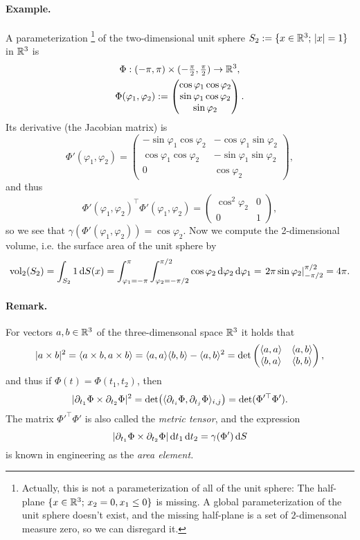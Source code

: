 \paragraph{Example.} A parameterization%
\footnote{Actually, this is not a parameterization of all of the unit sphere:
The half-plane $\{x\in\mathbb{R}^{3};\, x_{2}=0,x_{1}\le0\}$ is missing.
A global parameterization of the unit sphere doesn't exist, and the
missing half-plane is a set of $2$-dimensonal measure zero, so we
can disregard it.%
} of the two-dimensional unit sphere $S_{2}:=\{x\in\mathbb{R}^{3};\,\lvert x\rvert=1\}$
in $\mathbb{R}^{3}$ is\begin{gather*}
\Phi:(-\pi,\pi)\times(-\tfrac{\pi}{2},\tfrac{\pi}{2})\to\mathbb{R}^{3},\\
\Phi(\varphi_{1},\varphi_{2}):=\begin{pmatrix}\cos\varphi_{1}\cos\varphi_{2}\\
\sin\varphi_{1}\cos\varphi_{2}\\
\sin\varphi_{2}\end{pmatrix}.\end{gather*}
Its derivative (the Jacobian matrix) is\[
\Phi'(\varphi_{1},\varphi_{2})=\begin{pmatrix}-\sin\varphi_{1}\cos\varphi_{2} & -\cos\varphi_{1}\sin\varphi_{2}\\
\cos\varphi_{1}\cos\varphi_{2} & -\sin\varphi_{1}\sin\varphi_{2}\\
0 & \cos\varphi_{2}\end{pmatrix},\]
and thus\[
\Phi'(\varphi_{1},\varphi_{2})^{\top}\Phi'(\varphi_{1},\varphi_{2})=\begin{pmatrix}\cos^{2}\varphi_{2} & 0\\
0 & 1\end{pmatrix},\]
so we see that $\gamma(\Phi'(\varphi_{1},\varphi_{2}))=\cos\varphi_{2}$.
Now we compute the 2-dimensional volume, i.e. the surface area of
the unit sphere by\[
\operatorname{vol}_{2}(S_{2})=\int_{S_{2}}1\,\mathrm{d} S(x)=\int_{\varphi_{1}=-\pi}^{\pi}\int_{\varphi_{2}=-\pi/2}^{\pi/2}\cos\varphi_{2}\,\mathrm{d}\varphi_{2}\,\mathrm{d}\varphi_{1}=\left.2\pi\sin\varphi_{2}\right|_{-\pi/2}^{\pi/2}=4\pi.\]

\paragraph{Remark.}

For vectors $a,b\in\mathbb{R}^{3}$ of the three-dimensonal space $\mathbb{R}^{3}$
it holds that\[
\lvert a\times b\rvert^{2}=\langle a\times b,a\times b\rangle=\langle a,a\rangle\langle b,b\rangle-\langle a,b\rangle^{2}=\det\begin{pmatrix}\langle a,a\rangle & \langle a,b\rangle\\
\langle b,a\rangle & \langle b,b\rangle\end{pmatrix},\]
and thus if $\Phi(t)=\Phi(t_{1},t_{2})$, then\[
\lvert\partial_{t_{1}}\Phi\times\partial_{t_{2}}\Phi\rvert^{2}=\det\bigl(\langle\partial_{t_{i}}\Phi,\partial_{t_{j}}\Phi\rangle_{i,j}\bigr)=\det(\Phi'^{\top}\Phi').\]
The matrix $\Phi'^{\top}\Phi'$ is also called the \emph{metric
tensor}, and the expression \[
\lvert\partial_{t_{1}}\Phi\times\partial_{t_{2}}\Phi\rvert\,\mathrm{d} t_{1}\,\mathrm{d} t_{2}=\gamma(\Phi')\,\mathrm{d} S\]
 is known in engineering as the \emph{area element.}
